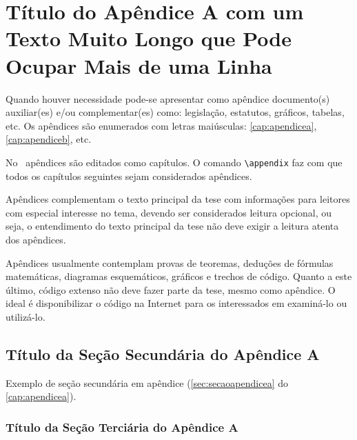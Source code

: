 
\chapter{Título do Apêndice A com um Texto Muito Longo que Pode Ocupar Mais de uma Linha}\label{cap:apendicea}

Quando houver necessidade pode-se apresentar como apêndice documento(s) auxiliar(es) e/ou complementar(es) como: legislação, estatutos, gráficos, tabelas, etc. Os apêndices são enumerados com letras maiúsculas: \autoref{cap:apendicea}, \autoref{cap:apendiceb}, etc.

No \latex\ apêndices são editados como capítulos. O comando \verb|\appendix| faz com que todos os capítulos seguintes sejam considerados apêndices.

Apêndices complementam o texto principal da tese com informações para leitores com especial interesse no tema, devendo ser considerados leitura opcional, ou seja, o entendimento do texto principal da tese não deve exigir a leitura atenta dos apêndices.

Apêndices usualmente contemplam provas de teoremas, deduções de fórmulas matemáticas, diagramas esquemáticos, gráficos e trechos de código. Quanto a este último, código extenso não deve fazer parte da tese, mesmo como apêndice. O ideal é disponibilizar o código na Internet para os interessados em examiná-lo ou utilizá-lo.

\section{Título da Seção Secundária do Apêndice A}\label{sec:secaoapendicea}

Exemplo de seção secundária em apêndice (\autoref{sec:secaoapendicea} do \autoref{cap:apendicea}).

\subsection{Título da Seção Terciária do Apêndice A}\label{subsec:subsecaoapendicea}

